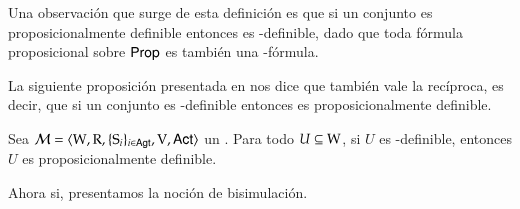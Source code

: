 Una observación que surge de esta definición es que si un conjunto es proposicionalmente definible entonces es \KHilogic-definible, dado que 
toda fórmula proposicional sobre ${\rm \sf Prop}$ es también una \KHilogic-fórmula.

La siguiente proposición presentada en \cite{ArecesFSV25,SaraviaPHD} nos dice que también vale la recíproca, 
es decir, que si un conjunto es \KHilogic-definible entonces es proposicionalmente definible.

\begin{proposicion}\label{prop:khi-implies-prop-definable}
    Sea $\mathcal{M}=\langle \mathrm{W},\mathrm{R},\{ \mathrm{S}_i \}_{i \in {\rm \sf Agt}},\mathrm{V},{\rm \sf Act} \rangle$ un \ults. Para todo $U \subseteq \mathrm{W}$, si $U$ es \KHilogic-definible, entonces $U$ es proposicionalmente definible.
\end{proposicion}

Ahora si, presentamos la noción de bisimulación.

